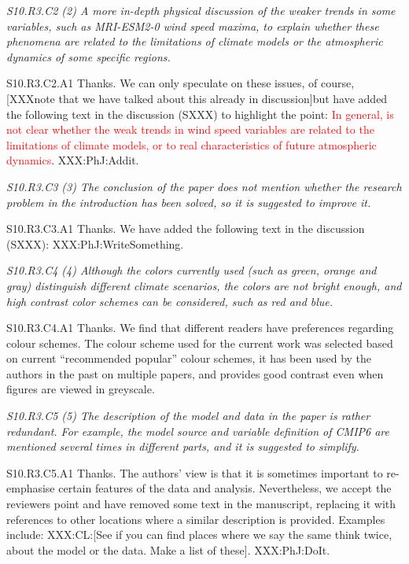 \documentclass[a4paper,10pt]{article}
\newcommand{\ed}[1]{\textcolor{red}{#1}}
\begin{document}
	\emph{S10.R3.C2 (2) A more in-depth physical discussion of the weaker trends in some variables, such as MRI-ESM2-0 wind speed maxima, to explain whether these phenomena are related to the limitations of climate models or the atmospheric dynamics of some specific regions.}

	S10.R3.C2.A1 Thanks. We can only speculate on these issues, of course, [XXXnote that we have talked about this already in discussion]but have added the following text in the discussion (SXXX) to highlight the point: \ed{In general, is not clear whether the weak trends in wind speed variables are related to the limitations of climate models, or to real characteristics of future atmospheric dynamics}. XXX:PhJ:Addit. 

	\emph{S10.R3.C3 (3) The conclusion of the paper does not mention whether the research problem in the introduction has been solved, so it is suggested to improve it.}

	S10.R3.C3.A1 Thanks. We have added the following text in the discussion (SXXX): XXX:PhJ:WriteSomething.

	\emph{S10.R3.C4 (4) Although the colors currently used (such as green, orange and gray) distinguish different climate scenarios, the colors are not bright enough, and high contrast color schemes can be considered, such as red and blue.}

	S10.R3.C4.A1 Thanks. We find that different readers have preferences regarding colour schemes. The colour scheme used for the current work was selected based on current ``recommended popular'' colour schemes, it has been used by the authors in the past on multiple papers, and provides good contrast even when figures are viewed in greyscale.

	\emph{S10.R3.C5 (5) The description of the model and data in the paper is rather redundant. For example, the model source and variable definition of CMIP6 are mentioned several times in different parts, and it is suggested to simplify.}

	S10.R3.C5.A1 Thanks. The authors' view is that it is sometimes important to re-emphasise certain features of the data and analysis. Nevertheless, we accept the reviewers point and have removed some text in the manuscript, replacing it with references to other locations where a similar description is provided. Examples include: XXX:CL:[See if you can find places where we say the same think twice, about the model or the data. Make a list of these]. XXX:PhJ:DoIt.
\end{document}
